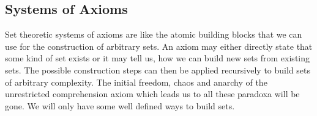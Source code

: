 







\subsection{Systems of Axioms}
Set theoretic systems of axioms are like the atomic building blocks that we can use for the construction of arbitrary sets. An axiom may either directly state that some kind of set exists or it may tell us, how we can build new sets from existing sets. The possible construction steps can then be applied recursively to build sets of arbitrary complexity. The initial freedom, chaos and anarchy of the unrestricted comprehension axiom which leads us to all these paradoxa will be gone. We will only have some well defined ways to build sets.

